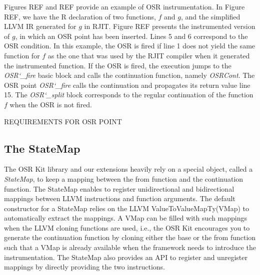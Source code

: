 Figures REF and REF provide an example of OSR instrumentation.
In Figure REF, we have the R declaration of two functions, $f$ and $g$, and the simplified LLVM IR generated for $g$ in RJIT.
Figure REF presents the instrumented version of $g$, in which an OSR point has been inserted.
Lines 5 and 6 correspond to the OSR condition.
In this example, the OSR is fired if line 1 does not yield the same function for $f$ as the one that was used by the RJIT compiler when it generated the instrumented function.
If the OSR is fired, the execution jumps to the \textit{OSR\char`_fire} basic block and calls the continuation function, namely \textit{OSRCont}.
The OSR point \textit{OSR\char`_fire} calls the continuation and propagates its return value line 15.
The \textit{OSR\char`_split} block corresponds to the regular continuation of the function $f$ when the OSR is not fired.\\

\begin{minipage}{\linewidth}
\end{minipage}

\begin{minipage}{\linewidth}
\end{minipage}

REQUIREMENTS FOR OSR POINT\\

\subsection{The StateMap}

The OSR Kit library and our extensions heavily rely on a special object, called a \textit{StateMap}, to keep a mapping between the from function and the continuation function.
The StateMap enables to register unidirectional and bidirectional mappings between LLVM instructions and function arguments.
The default constructor for a StateMap relies on the LLVM ValueToValueMapTy\cite{VMap}(VMap) to automatically extract the mappings.
A VMap can be filled with such mappings when the LLVM cloning functions are used, i.e., the OSR Kit encourages you to generate the continuation function by cloning either the base or the from function such that a VMap is already available when the framework needs to introduce the instrumentation.
The StateMap also provides an API to register and unregister mappings by directly providing the two instructions.\\

